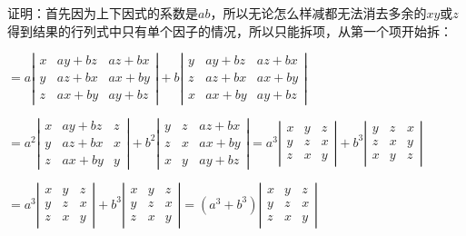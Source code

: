 \documentclass[UTF8, 12pt]{ctexart}
\begin{document}
证明：首先因为上下因式的系数是$ab$，所以无论怎么样减都无法消去多余的$xy$或$z$得到结果的行列式中只有单个因子的情况，所以只能拆项，从第一个项开始拆：

$=a\left|\begin{array}{ccc}
    x & ay+bz & az+bx \\
    y & az+bx & ax+by \\
    z & ax+by & ay+bz
\end{array}\right|+b\left|\begin{array}{ccc}
    y & ay+bz & az+bx \\
    z & az+bx & ax+by \\
    x & ax+by & ay+bz
\end{array}\right|$

$=a^2\left|\begin{array}{ccc}
    x & ay+bz & z \\
    y & az+bx & x \\
    z & ax+by & y
\end{array}\right|+b^2\left|\begin{array}{ccc}
    y & z & az+bx \\
    z & x & ax+by \\
    x & y & ay+bz
\end{array}\right|=a^3\left|\begin{array}{ccc}
    x & y & z \\
    y & z & x \\
    z & x & y
\end{array}\right|+b^3\left|\begin{array}{ccc}
    y & z & x \\
    z & x & y \\
    x & y & z
\end{array}\right|$

$=a^3\left|\begin{array}{ccc}
    x & y & z \\
    y & z & x \\
    z & x & y
\end{array}\right|+b^3\left|\begin{array}{ccc}
    x & y & z \\
    y & z & x \\
    z & x & y
\end{array}\right|=(a^3+b^3)\left|\begin{array}{ccc}
    x & y & z \\
    y & z & x \\
    z & x & y
\end{array}\right|
$
\end{document}
